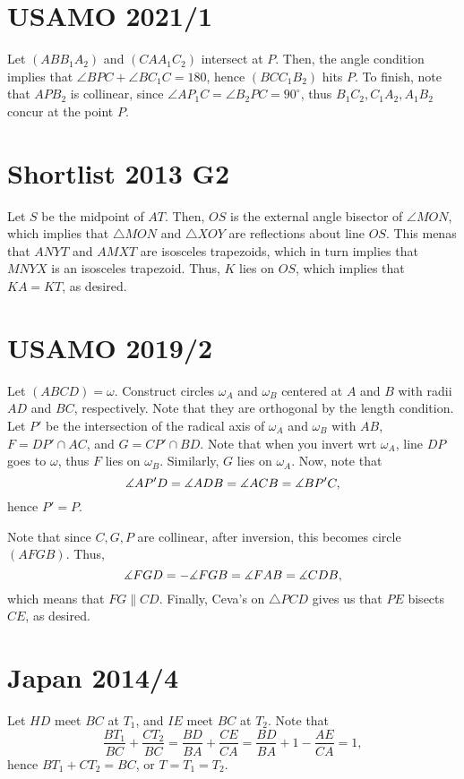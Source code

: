 \documentclass[11pt]{scrartcl}
\begin{document}
\section{USAMO 2021/1}
Let $(ABB_1A_2)$ and $(CAA_1C_2)$ intersect at $P$. Then, the angle condition implies that $\angle BPC + \angle BC_1C = 180$, hence $(BCC_1B_2)$ hits $P$. To finish, note that $APB_2$ is collinear, since $\angle AP_1C = \angle B_2PC = 90^\circ$, thus $B_1C_2, C_1A_2, A_1B_2$ concur at the point $P$. 

\section{Shortlist 2013 G2}
Let $S$ be the midpoint of $AT$. Then, $OS$ is the external angle bisector of $\angle MON$, which implies that $\triangle MON$ and $\triangle XOY$ are reflections about line $OS$. This menas that $ANYT$ and $AMXT$ are isosceles trapezoids, which in turn implies that $MNYX$ is an isosceles trapezoid. Thus, $K$ lies on $OS$, which implies that $KA=KT$, as desired.

\section{USAMO 2019/2}
Let $(ABCD)=\omega$. Construct circles $\omega_A$ and $\omega_B$ centered at $A$ and $B$ with radii $AD$ and $BC$, respectively. Note that they are orthogonal by the length condition. Let $P'$ be the intersection of the radical axis of $\omega_A$ and $\omega_B$ with $AB$, $F=DP' \cap AC$, and $G = CP' \cap BD$. Note that when you invert wrt $\omega_A$, line $DP$ goes to $\omega$, thus $F$ lies on $\omega_B$. Similarly, $G$ lies on $\omega_A$. Now, note that \[\measuredangle AP'D = \measuredangle ADB = \measuredangle ACB = \measuredangle BP'C,\] hence $P'=P$. 

Note that since $C, G, P$ are collinear, after inversion, this becomes circle $(AFGB)$. Thus, \[\measuredangle FGD = -\measuredangle FGB = \measuredangle FAB = \measuredangle CDB,\] which means that $FG \parallel CD$. Finally, Ceva's on $\triangle PCD$ gives us that $PE$ bisects $CE$, as desired. 

\section{Japan 2014/4}
Let $HD$ meet $BC$ at $T_1$, and $IE$ meet $BC$ at $T_2$. Note that 
\[\frac{BT_1}{BC} + \frac{CT_2}{BC} = \frac{BD}{BA} + \frac{CE}{CA} = \frac{BD}{BA} + 1 - \frac{AE}{CA} = 1,\] hence $BT_1+CT_2=BC$, or $T=T_1=T_2$. 
\end{document}
